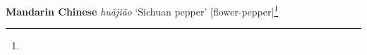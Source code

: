 \begin{etymology}\label{ety:huajiao}
\textbf{Mandarin Chinese}  \textit{huā​jiāo} `Sichuan pepper' [flower-pepper]\footnote{}
\end{etymology}